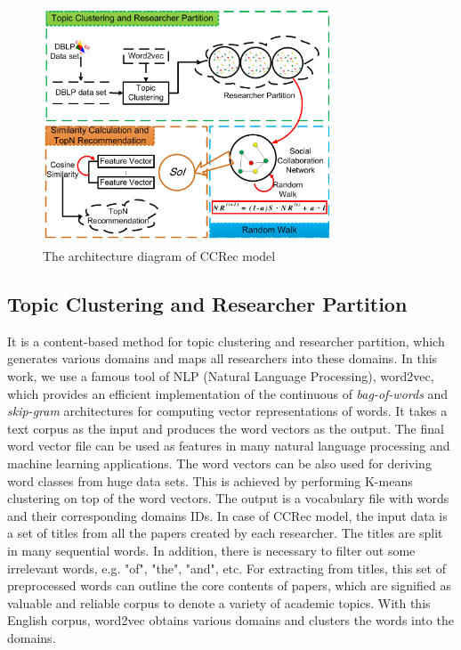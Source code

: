 \documentclass{acm_proc_article-sp}
\begin{document}

\begin{figure}
\centering
\includegraphics [width=3.4in]{Fig1.pdf}
\caption{The architecture diagram of CCRec model}
\end{figure}

\subsection{Topic Clustering and Researcher Partition}
It is a content-based method for topic clustering and researcher partition, which generates various domains and maps all researchers into these domains. In this work, we use a famous tool of NLP (Natural Language Processing), word2vec, which provides an efficient implementation of the continuous of \emph{bag-of-words} and \emph{skip-gram} architectures for computing vector representations of words. It takes a text corpus as the input and produces the word vectors as the output. The final word vector file can be used as features in many natural language processing and machine learning applications. The word vectors can be also used for deriving word classes from huge data sets. This is achieved by performing K-means clustering on top of the word vectors. The output is a vocabulary file with words and their corresponding domains IDs. In case of CCRec model, the input data is a set of titles from all the papers created by each researcher. The titles are split in many sequential words. In addition, there is necessary to filter out some irrelevant words, e.g. "of", "the", "and", etc. For extracting from titles, this set of preprocessed words can outline the core contents of papers, which are signified as valuable and reliable corpus to denote a variety of academic topics. With this English corpus, word2vec obtains various domains and clusters the words into the domains.
\end{document}
